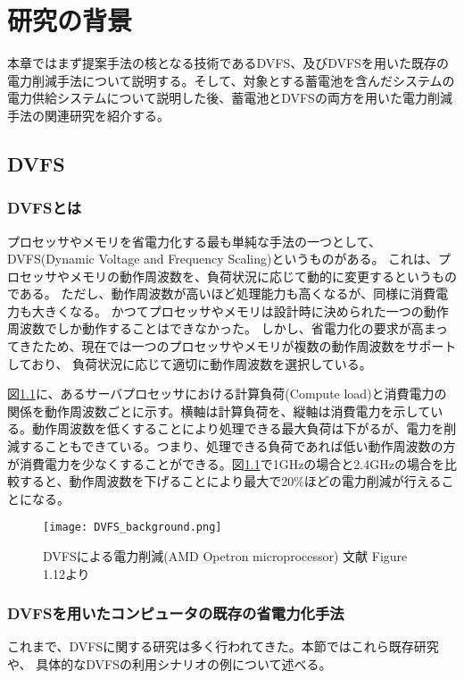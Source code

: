 \chapter{研究の背景}
\label{chap:background}

本章ではまず提案手法の核となる技術であるDVFS、及びDVFSを用いた既存の電力削減手法について説明する。そして、対象とする蓄電池を含んだシステムの電力供給システムについて説明した後、蓄電池とDVFSの両方を用いた電力削減手法の関連研究を紹介する。

\section{DVFS}
\label{sec:dvfs}

\subsection{DVFSとは}
プロセッサやメモリを省電力化する最も単純な手法の一つとして、DVFS(Dynamic Voltage and Frequency Scaling)というものがある。
これは、プロセッサやメモリの動作周波数を、負荷状況に応じて動的に変更するというものである。
ただし、動作周波数が高いほど処理能力も高くなるが、同様に消費電力も大きくなる。
かつてプロセッサやメモリは設計時に決められた一つの動作周波数でしか動作することはできなかった。
しかし、省電力化の要求が高まってきたため、現在では一つのプロセッサやメモリが複数の動作周波数をサポートしており、
負荷状況に応じて適切に動作周波数を選択している。


図\ref{fig:dvfs_background}に、あるサーバプロセッサにおける計算負荷(Compute load)と消費電力の関係を動作周波数ごとに示す\cite{Hennessy:2011:CAF:1999263}。横軸は計算負荷を、縦軸は消費電力を示している。動作周波数を低くすることにより処理できる最大負荷は下がるが、電力を削減することもできている。つまり、処理できる負荷であれば低い動作周波数の方が消費電力を少なくすることができる。図\ref{fig:dvfs_background}で1GHzの場合と2.4GHzの場合を比較すると、動作周波数を下げることにより最大で20\%ほどの電力削減が行えることになる。

\begin{figure}[t]
 \begin{center}
  \texttt{[image: DVFS\_background.png]}
 \end{center}
 \caption{DVFSによる電力削減(AMD Opetron microprocessor) 文献\cite{Hennessy:2011:CAF:1999263} Figure 1.12より}
 \label{fig:dvfs_background}
\end{figure}



\subsection{DVFSを用いたコンピュータの既存の省電力化手法}
これまで、DVFSに関する研究は多く行われてきた。本節ではこれら既存研究や、
具体的なDVFSの利用シナリオの例について述べる。


